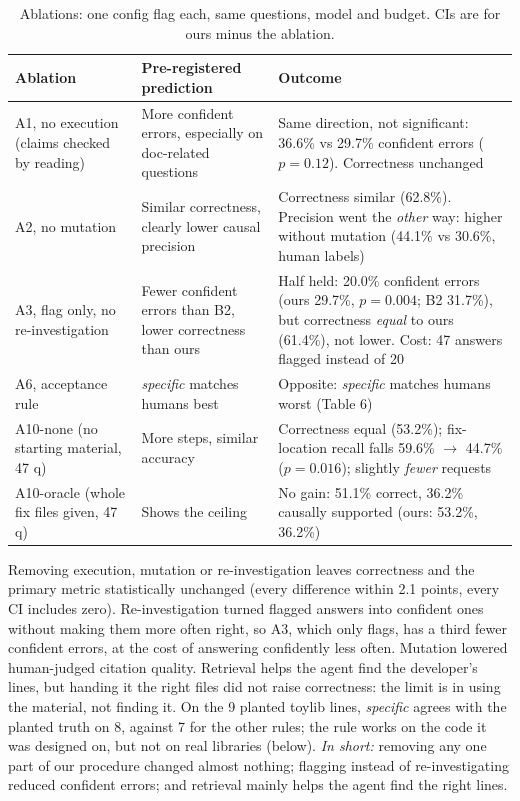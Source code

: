 \documentclass[10pt,a4paper]{article}
\begin{document}
\begin{table}[!htb]
\centering\footnotesize
\caption{Ablations: one config flag each, same questions, model and budget. CIs are for ours minus the ablation.}
\begin{tabularx}{\linewidth}{@{}>{\raggedright\arraybackslash}p{3.3cm} >{\raggedright\arraybackslash}p{4.4cm} Y@{}}
\toprule
Ablation & Pre-registered prediction & Outcome\\
\midrule
A1, no execution (claims checked by reading) & More confident errors, especially on doc-related questions & Same direction, not significant: 36.6\% vs 29.7\% confident errors ($p=0.12$). Correctness unchanged\\
A2, no mutation & Similar correctness, clearly lower causal precision & Correctness similar (62.8\%). Precision went the \emph{other} way: higher without mutation (44.1\% vs 30.6\%, human labels)\\
A3, flag only, no re-investigation & Fewer confident errors than B2, lower correctness than ours & Half held: 20.0\% confident errors (ours 29.7\%, $p=0.004$; B2 31.7\%), but correctness \emph{equal} to ours (61.4\%), not lower. Cost: 47 answers flagged instead of 20\\
A6, acceptance rule & \emph{specific} matches humans best & Opposite: \emph{specific} matches humans worst (Table 6)\\
A10-none (no starting material, 47 q) & More steps, similar accuracy & Correctness equal (53.2\%); fix-location recall falls 59.6\% $\rightarrow$ 44.7\% ($p=0.016$); slightly \emph{fewer} requests\\
A10-oracle (whole fix files given, 47 q) & Shows the ceiling & No gain: 51.1\% correct, 36.2\% causally supported (ours: 53.2\%, 36.2\%)\\
\bottomrule
\end{tabularx}
\end{table}

Removing execution, mutation or re-investigation leaves correctness and the primary metric statistically unchanged
(every difference within 2.1 points, every CI includes zero). Re-investigation turned flagged answers into confident
ones without making them more often right, so A3, which only flags, has a third fewer confident errors, at the cost of
answering confidently less often. Mutation lowered human-judged citation quality. Retrieval helps the agent find the
developer's lines, but handing it the right files did not raise correctness: the limit is in using the material, not
finding it. On the 9 planted toylib lines, \emph{specific} agrees with the planted truth on 8, against 7 for the other
rules; the rule works on the code it was designed on, but not on real libraries (below).
\emph{In short:} removing any one part of our procedure changed almost nothing; flagging instead of re-investigating
reduced confident errors; and retrieval mainly helps the agent find the right lines.
\end{document}
